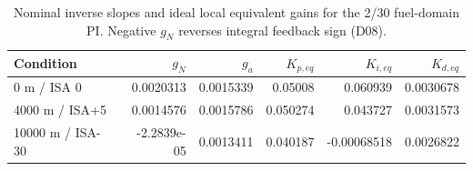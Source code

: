 \begin{table}[htbp]\centering\small\setlength{\tabcolsep}{4pt}\begin{tabular}{@{}lrrrrr@{}}\toprule
Condition & $g_N$ & $g_a$ & $K_{p,eq}$ & $K_{i,eq}$ & $K_{d,eq}$\\\midrule
0 m / ISA 0 & 0.0020313 & 0.0015339 & 0.05008 & 0.060939 & 0.0030678\\
4000 m / ISA+5 & 0.0014576 & 0.0015786 & 0.050274 & 0.043727 & 0.0031573\\
10000 m / ISA-30 & -2.2839e-05 & 0.0013411 & 0.040187 & -0.00068518 & 0.0026822\\
\bottomrule\end{tabular}\caption{Nominal inverse slopes and ideal local equivalent gains for the 2/30 fuel-domain PI. Negative $g_N$ reverses integral feedback sign (D08).}\label{tab:slopes}\end{table}